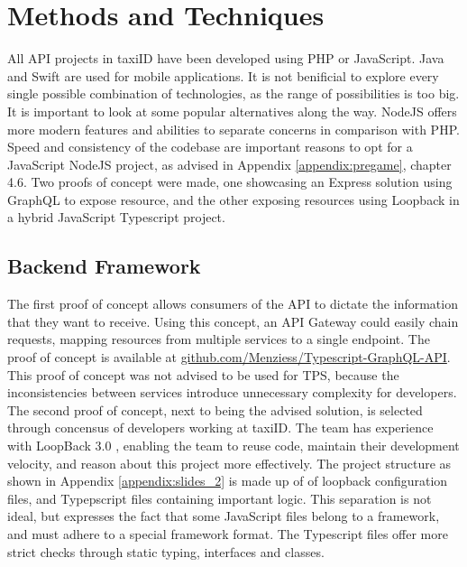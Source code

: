 %
\section{Methods and Techniques}
All API projects in taxiID have been developed using PHP or JavaScript. Java and Swift are used for mobile applications. It is not benificial to explore every single possible combination of technologies, as the range of possibilities is too big. It is important to look at some popular alternatives along the way. NodeJS offers more modern features and abilities to separate concerns in comparison with PHP. Speed and consistency of the codebase are important reasons to opt for a JavaScript NodeJS project, as advised in Appendix \ref{appendix:pregame}, chapter 4.6. Two proofs of concept were made, one showcasing an Express solution using GraphQL to expose resource, and the other exposing resources using Loopback in a hybrid JavaScript Typescript project.

\subsection{Backend Framework}
The first proof of concept allows consumers of the API to dictate the information that they want to receive. Using this concept, an API Gateway could easily chain requests, mapping resources from multiple services to a single endpoint. The proof of concept is available at \url{github.com/Menziess/Typescript-GraphQL-API}. This proof of concept was not advised to be used for TPS, because the inconsistencies between services introduce unnecessary complexity for developers. The second proof of concept, next to being the advised solution, is selected through concensus of developers working at taxiID. The team has experience with LoopBack 3.0 \cite{lb}, enabling the team to reuse code, maintain their development velocity, and reason about this project more effectively. The project structure as shown in Appendix \ref{appendix:slides_2} is made up of of loopback configuration files, and Typepscript files containing important logic. This separation is not ideal, but expresses the fact that some JavaScript files belong to a framework, and must adhere to a special framework format. The Typescript files offer more strict checks through static typing, interfaces and classes.

